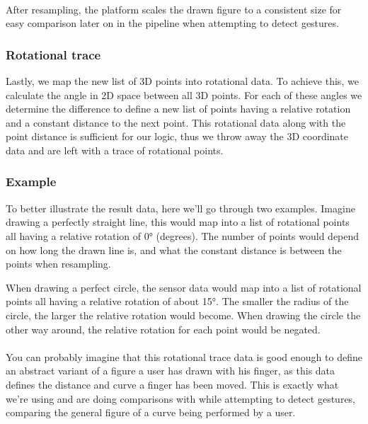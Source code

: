 \documentclass{standalone}
\begin{document}
  \paragraph{}
  After resampling, the platform scales the drawn figure to a consistent size
  for easy comparison later on in the pipeline when attempting to detect
  gestures.

  \subsubsection{Rotational trace}
  Lastly, we map the new list of 3D points into rotational data. To achieve
  this, we calculate the angle in 2D space between all 3D points. For each of
  these angles we determine the difference to define a new list of points having
  a relative rotation and a constant distance to the next point.
  This rotational data along with the point distance is sufficient for our logic,
  thus we throw away the 3D coordinate data and are left with a trace of
  rotational points.

  \subsubsection{Example}
  To better illustrate the result data, here we'll go through two examples.
  Imagine drawing a perfectly straight line, this would map into a list of
  rotational points all having a relative rotation of 0\si{\degree} (degrees). The number of
  points would depend on how long the drawn line is, and what the constant
  distance is between the points when resampling.

  When drawing a perfect circle, the sensor data would map into a list of
  rotational points all having a relative rotation of about 15\si{\degree}. The
  smaller the radius of the circle, the larger the relative rotation would
  become. When drawing the circle the other way around, the relative rotation
  for each point would be negated.

  \paragraph{}
  You can probably imagine that this rotational trace data is good enough to
  define an abstract variant of a figure a user has drawn with his
  finger, as this data defines the distance and curve a finger has been moved.
  This is exactly what we're using and are doing comparisons with while
  attempting to detect gestures, comparing the general figure of a curve being
  performed by a user.
\end{document}
